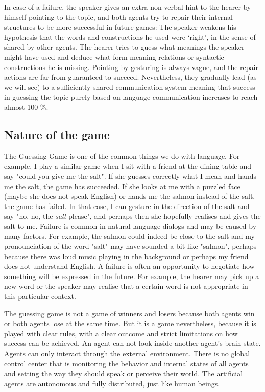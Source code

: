 In case of a failure, the speaker gives an extra non-verbal
hint to the hearer by himself pointing to the topic, 
and both agents try to repair
their internal structures to be more successful in future
games: The speaker weakens his hypothesis that the words
and constructions he used 
were `right', in the sense of shared by other agents. 
The hearer tries to guess what meanings the speaker 
might have used and deduce what form-meaning relations or 
syntactic constructions he is missing. Pointing by gesturing is
always vague, and the repair actions are far from guaranteed to succeed. 
Nevertheless, they gradually lead (as we will see) to 
a sufficiently shared communication system meaning that 
success in guessing the topic purely based on language
communication increases to reach almost 100 \%. 

\subsection{Nature of the game}

The Guessing Game is one of the common things we do with language. 
For example, I play a similar game when I sit with a friend
at the dining table and say "could you give me the salt". 
If she guesses correctly what I mean and hands 
me the salt, the game has succeeded. If she looks at me 
with a puzzled face (maybe she does not speak English) or hands me
the salmon instead of the salt, the game has failed. In that case, 
I can gesture in the direction of the salt and say "no, no, the {\it salt}
please", and perhaps then she hopefully realises and gives the salt to me. Failure 
is common in natural language dialogs and may be caused by 
many factors. For example, the salmon could indeed 
be close to the salt and my pronounciation of the word "salt"
may have sounded a bit like "salmon", perhaps because there was
loud music playing in the background or perhaps
my friend does not understand English. 
A failure is often 
an opportunity to negotiate how something will be expressed
in the future. For example, the hearer may pick up a new word
or the speaker may realise that a certain word is 
not appropriate in this particular context. 

The guessing game is not a game of winners and losers because both 
agents win or both agents lose at the same time. But it is a game
nevertheless, because it is played with clear rules, 
with a clear outcome and strict limitations on how 
success can be achieved. An agent can not look inside another
agent's brain state. Agents can only interact through the 
external environment. There is no global control 
center that is monitoring the behavior and internal states
of all agents and setting the way they should speak or 
perceive their world. The artificial agents are autonomous and
fully distributed, just like human beings. 

